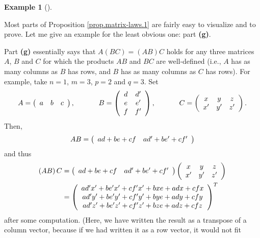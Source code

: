 \documentclass[numbers=enddot,12pt,final,onecolumn,notitlepage]{scrartcl}%
\theoremstyle{definition}
\newtheorem{exam}[theo]{Example}
\newenvironment{example}[1][]
{\begin{exam}[#1]\begin{leftbar}}
{\end{leftbar}\end{exam}}
\begin{document}
\begin{example}
Most parts of Proposition \ref{prop.matrix-laws.1} are fairly easy to
visualize and to prove. Let me give an example for the least obvious one: part
\textbf{(g)}.

Part \textbf{(g)} essentially says that $A\left(  BC\right)  =\left(
AB\right)  C$ holds for any three matrices $A$, $B$ and $C$ for which the
products $AB$ and $BC$ are well-defined (i.e., $A$ has as many columns as $B$
has rows, and $B$ has as many columns as $C$ has rows). For example, take
$n=1$, $m=3$, $p=2$ and $q=3$. Set%
\[
A=\left(
\begin{array}
[c]{ccc}%
a & b & c
\end{array}
\right)  ,\ \ \ \ \ \ \ \ \ \ B=\left(
\begin{array}
[c]{cc}%
d & d^{\prime}\\
e & e^{\prime}\\
f & f^{\prime}%
\end{array}
\right)  ,\ \ \ \ \ \ \ \ \ \ C=\left(
\begin{array}
[c]{ccc}%
x & y & z\\
x^{\prime} & y^{\prime} & z^{\prime}%
\end{array}
\right)  .
\]
Then,%
\[
AB=\left(
\begin{array}
[c]{cc}%
ad+be+cf & ad^{\prime}+be^{\prime}+cf^{\prime}%
\end{array}
\right)
\]
and thus%
\begin{align*}
\left(  AB\right)  C  &  =\left(
\begin{array}
[c]{cc}%
ad+be+cf & ad^{\prime}+be^{\prime}+cf^{\prime}%
\end{array}
\right)  \left(
\begin{array}
[c]{ccc}%
x & y & z\\
x^{\prime} & y^{\prime} & z^{\prime}%
\end{array}
\right) \\
&  =\left(
\begin{array}
[c]{c}%
ad^{\prime}x^{\prime}+be^{\prime}x^{\prime}+cf^{\prime}x^{\prime
}+bxe+adx+cfx\\
ad^{\prime}y^{\prime}+be^{\prime}y^{\prime}+cf^{\prime}y^{\prime
}+bye+ady+cfy\\
ad^{\prime}z^{\prime}+be^{\prime}z^{\prime}+cf^{\prime}z^{\prime}+bze+adz+cfz
\end{array}
\right)  ^{T}%
\end{align*}
after some computation. (Here, we have written the result as a transpose of a
column vector, because if we had written it as a row vector, it would not fit

\end{example}
\end{document}
